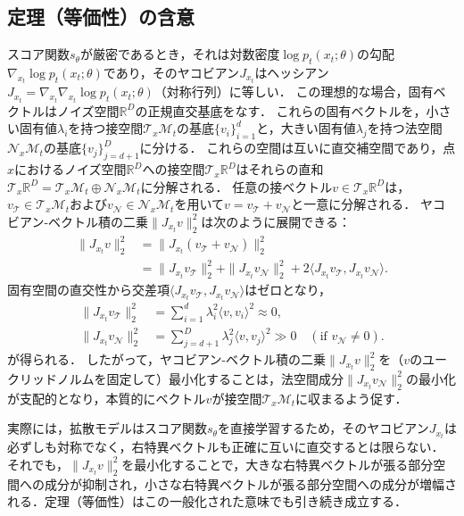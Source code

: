 \documentclass[MIRU,submit]{miru2026j}
\theoremstyle{definition}
\newcommand{\gM}{{\mathcal{M}}}
\newcommand{\gN}{{\mathcal{N}}}
\newcommand{\gT}{{\mathcal{T}}}
\newcommand{\R}{\mathbb{R}}
\begin{document}
\subsection{定理（等価性）の含意}\label{appendix:proposition_1}
スコア関数$s_\theta$が厳密であるとき，それは対数密度$\log p_t(x_t;\theta)$の勾配$\nabla_{x_t}\log p_t(x_t;\theta)$であり，そのヤコビアン$J_{x_t}$はヘッシアン$J_{x_t}=\nabla_{x_t}\nabla_{x_t}\log p_t(x_t;\theta)$（対称行列）に等しい．
この理想的な場合，固有ベクトルはノイズ空間$\R^D$の正規直交基底をなす．
これらの固有ベクトルを，小さい固有値$\lambda_i$を持つ接空間$\gT_x\gM_t$の基底$\{ v_i \}_{i=1}^d$と，大きい固有値$\lambda_j$を持つ法空間$\gN_x\gM_t$の基底$\{ v_j \}_{j=d+1}^D$に分ける．
これらの空間は互いに直交補空間であり，点$x$におけるノイズ空間$\R^D$への接空間$\gT_x\R^D$はそれらの直和$\gT_x\R^D = \gT_{x}\gM_t \oplus \gN_{x}\gM_t$に分解される．
任意の接ベクトル$v \in \gT_x\R^D$は，$v_\gT \in \gT_x\gM_t$および$v_\gN \in \gN_x\gM_t$を用いて$v = v_\gT + v_\gN$と一意に分解される．
ヤコビアン-ベクトル積の二乗$\|J_{x_t} v\|_2^2$は次のように展開できる：
\begin{equation}
    \textstyle
    \begin{aligned}
        \|J_{x_t} v\|_2^2 & = \|J_{x_t}(v_\gT + v_\gN)\|_2^2                                                                 \\
                          & = \|J_{x_t} v_\gT\|_2^2 + \|J_{x_t} v_\gN\|_2^2 + 2\langle J_{x_t} v_\gT, J_{x_t} v_\gN \rangle.
    \end{aligned}
\end{equation}
固有空間の直交性から交差項$\langle J_{x_t} v_\gT, J_{x_t} v_\gN \rangle$はゼロとなり，
\begin{equation}
    \begin{aligned}
        \textstyle \|J_{x_t} v_\gT\|_2^2 & = \textstyle \sum_{i=1}^d \lambda_i^2 \langle v, v_i \rangle^2 \approx 0,                               \\
        \textstyle \|J_{x_t} v_\gN\|_2^2 & = \textstyle \sum_{j=d+1}^D \lambda_j^2 \langle v, v_j \rangle^2 \gg 0 \quad (\text{if } v_\gN \neq 0).
    \end{aligned}
\end{equation}
が得られる．
したがって，ヤコビアン-ベクトル積の二乗$\|J_{x_t} v\|_2^2$を（$v$のユークリッドノルムを固定して）最小化することは，法空間成分$\|J_{x_t} v_\gN\|_2^2$の最小化が支配的となり，本質的にベクトル$v$が接空間$\gT_x\gM_t$に収まるよう促す．

実際には，拡散モデルはスコア関数$s_\theta$を直接学習するため，そのヤコビアン$J_{x_t}$は必ずしも対称でなく，右特異ベクトルも正確に互いに直交するとは限らない．
それでも，$\|J_{x_t} v\|_2^2$を最小化することで，大きな右特異ベクトルが張る部分空間への成分が抑制され，小さな右特異ベクトルが張る部分空間への成分が増幅される．定理（等価性）はこの一般化された意味でも引き続き成立する．
\end{document}
